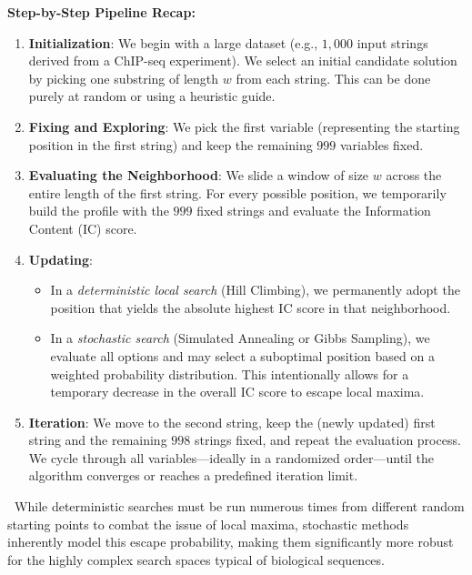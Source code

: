 \documentclass[11pt, a4paper]{article}
\newcommand{\sta}{\textbf{\sffamily [CRITICAL / EXAM]\ }}
\begin{document}
\textbf{Step-by-Step Pipeline Recap:}
\begin{enumerate}
    \item \textbf{Initialization}: We begin with a large dataset (e.g., $1,000$ input strings derived from a ChIP-seq experiment). We select an initial candidate solution by picking one substring of length $w$ from each string. This can be done purely at random or using a heuristic guide.
    \item \textbf{Fixing and Exploring}: We pick the first variable (representing the starting position in the first string) and keep the remaining $999$ variables fixed. 
    \item \textbf{Evaluating the Neighborhood}: We slide a window of size $w$ across the entire length of the first string. For every possible position, we temporarily build the profile with the $999$ fixed strings and evaluate the Information Content (IC) score.
    \item \textbf{Updating}: 
    \begin{itemize}
        \item In a \textit{deterministic local search} (Hill Climbing), we permanently adopt the position that yields the absolute highest IC score in that neighborhood.
        \item In a \textit{stochastic search} (Simulated Annealing or Gibbs Sampling), we evaluate all options and may select a suboptimal position based on a weighted probability distribution. This intentionally allows for a temporary decrease in the overall IC score to escape local maxima.
    \end{itemize}
    \item \textbf{Iteration}: We move to the second string, keep the (newly updated) first string and the remaining $998$ strings fixed, and repeat the evaluation process. We cycle through all variables—ideally in a randomized order—until the algorithm converges or reaches a predefined iteration limit.
\end{enumerate}

\sta While deterministic searches must be run numerous times from different random starting points to combat the issue of local maxima, stochastic methods inherently model this escape probability, making them significantly more robust for the highly complex search spaces typical of biological sequences.

\end{document}
